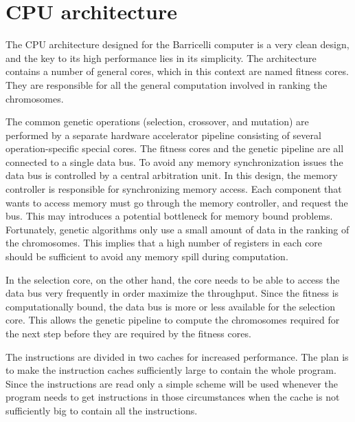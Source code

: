 \section {CPU architecture}

The CPU architecture designed for the Barricelli computer is a very clean design, and the key to its high performance lies in its simplicity.
The architecture contains a number of general cores, which in this context are named fitness cores.
They are responsible for all the general computation involved in ranking the chromosomes.

The common genetic operations (selection, crossover, and mutation) are performed by a separate hardware accelerator pipeline consisting of several operation-specific special cores.
The fitness cores and the genetic pipeline are all connected to a single data bus.
To avoid any memory synchronization issues the data bus is controlled by a central arbitration unit.
In this design, the memory controller is responsible for synchronizing memory access.
Each component that wants to access memory must go through the memory controller, and request the bus.
This may introduces a potential bottleneck for memory bound problems.
Fortunately, genetic algorithms only use a small amount of data in the ranking of the chromosomes.
This implies that a high number of registers in each core should be sufficient to avoid any memory spill during computation.

In the selection core, on the other hand, the core needs to be able to access the data bus very frequently in order maximize the throughput.
Since the fitness is computationally bound, the data bus is more or less available for the selection core.
This allows the genetic pipeline to compute the chromosomes required for the next step before they are required by the fitness cores. 


The instructions are divided in two caches for increased performance.
The plan is to make the instruction caches sufficiently large to contain the whole program.
Since the instructions are read only a simple scheme will be used whenever the program needs to get instructions in those circumstances when the cache is not sufficiently big to contain all the instructions. 
